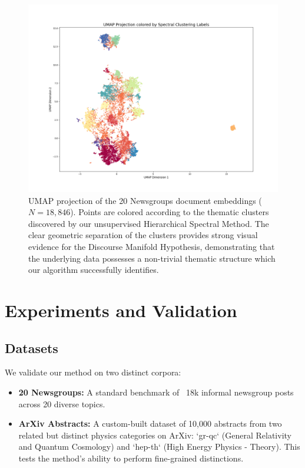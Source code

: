 \documentclass[conference]{IEEEtran}
\begin{document}
\begin{figure}[t]
\centering
\includegraphics[width=\textwidth]{umap_spectral_clusters.png}
\caption{UMAP projection of the 20 Newsgroups document embeddings ($N=18,846$). Points are colored according to the thematic clusters discovered by our unsupervised Hierarchical Spectral Method. The clear geometric separation of the clusters provides strong visual evidence for the Discourse Manifold Hypothesis, demonstrating that the underlying data possesses a non-trivial thematic structure which our algorithm successfully identifies.}
\label{fig:umap}
\end{figure}

\section{Experiments and Validation}

\subsection{Datasets}
We validate our method on two distinct corpora:
\begin{itemize}
    \item \textbf{20 Newsgroups:} A standard benchmark of ~18k informal newsgroup posts across 20 diverse topics.
    \item \textbf{ArXiv Abstracts:} A custom-built dataset of 10,000 abstracts from two related but distinct physics categories on ArXiv: `gr-qc` (General Relativity and Quantum Cosmology) and `hep-th` (High Energy Physics - Theory). This tests the method's ability to perform fine-grained distinctions.
\end{itemize}
\end{document}

